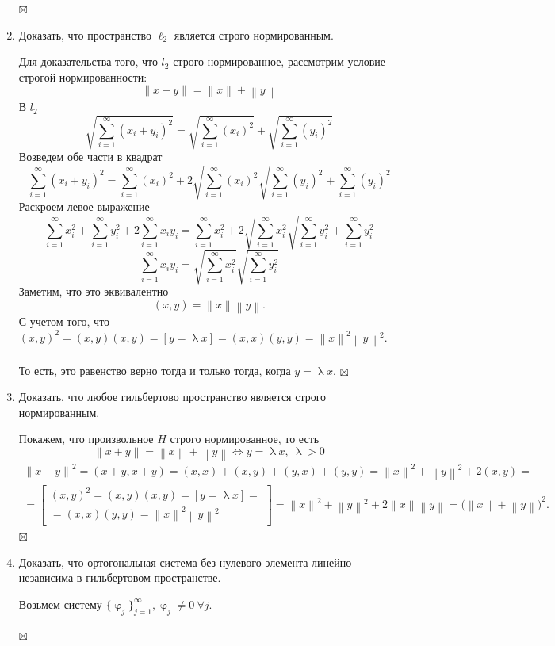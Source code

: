 \documentclass[a4paper, 12pt]{report}
\newenvironment{Proof} %
{\par\noindent{$\blacklozenge$}} %
{\hfill$\scriptstyle\boxtimes$}
\renewcommand{\varphi}{\upvarphi}
\renewcommand{\lambda}{\uplambda}
\newcommand\Norm[1]{\left\| #1 \right\|}
\begin{document}
\begin{enumerate}
\begin{Proof}
		 \end{Proof}
		\item Доказать, что пространство $\ell_{2}$ является строго нормированным.
		\begin{Proof}
			Для доказательства того, что $l_2$ строго нормированное, рассмотрим условие строгой нормированности: $$\Norm{x + y} = \Norm{x} + \Norm{y}$$
		В $l_2$
		$$\sqrt{\sum_{i=1}^{\infty}(x_i + y_i)^2} = \sqrt{\sum_{i=1}^{\infty}(x_i)^2}+ \sqrt{\sum_{i=1}^{\infty}(y_i)^2}$$
		Возведем обе части в квадрат
		$$\sum_{i=1}^{\infty}(x_i + y_i)^2 =\sum_{i=1}^{\infty}(x_i)^2 + 2\sqrt{\sum_{i=1}^{\infty}(x_i)^2} \sqrt{\sum_{i=1}^{\infty}(y_i)^2} + \sum_{i=1}^{\infty}(y_i)^2$$
		Раскроем левое выражение
		$$\sum_{i=1}^{\infty}x_i^2 + \sum_{i=1}^{\infty}y_i^2 + 2\sum_{i=1}^{\infty}x_iy_i =\sum_{i=1}^{\infty}x_i^2 + 2\sqrt{\sum_{i=1}^{\infty}x_i^2} \sqrt{\sum_{i=1}^{\infty}y_i^2} + \sum_{i=1}^{\infty}y_i^2$$
		$$\sum_{i=1}^{\infty}x_iy_i = \sqrt{\sum_{i=1}^{\infty}x_i^2} \sqrt{\sum_{i=1}^{\infty}y_i^2}$$
		Заметим, что это эквивалентно $$(x,y) = \Norm{x}\Norm{y}.$$
		С учетом того, что $(x,y)^2 = (x,y)(x,y) = [y=\lambda x] = (x,x)(y,y) = \Norm{x}^2\Norm{y}^2$.\\\\
		То есть, это равенство верно тогда и только тогда, когда $y = \lambda x$.
		\end{Proof}
		\item  Доказать, что любое гильбертово пространство является строго нормированным.
		\begin{Proof}
			Покажем, что произвольное $H$ строго нормированное, то есть $$\Norm{x+y} = \Norm{x} + \Norm{y}\Longleftrightarrow y = \lambda x,\ \lambda > 0$$
		\begin{multline*}
			\Norm{x+y}^2 = (x+y,x+y) = (x,x) + (x,y) + (y,x) + (y,y) = \Norm{x}^2 + \Norm{y}^2 + 2(x,y) =\\= \begin{bmatrix}
				(x,y)^2 = (x,y)(x,y) = [y=\lambda x] =\\= (x,x)(y,y) = \Norm{x}^2\Norm{y}^2
			\end{bmatrix} = \Norm{x}^2 + \Norm{y}^2 + 2\Norm{x}\Norm{y} = \Big(\Norm{x} + \Norm{y}\Big)^2.
		\end{multline*}
		\end{Proof}
		\item Доказать, что ортогональная система без нулевого элемента линейно независима в гильбертовом пространстве.
		\begin{Proof}
			Возьмем систему $\{\varphi_j\}_{j=1}^{\infty}, \varphi_j \ne 0\ \forall j.$

\end{Proof}
\end{enumerate}
\end{document}
